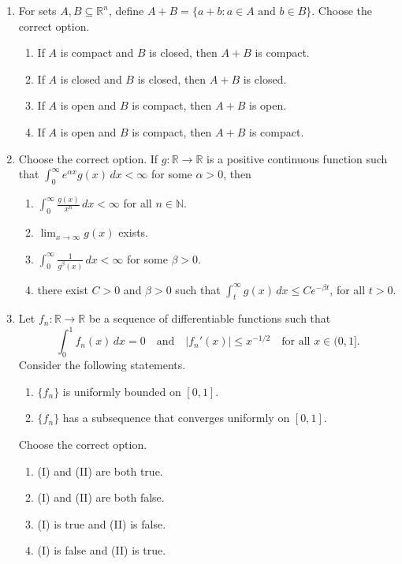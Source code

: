 \documentclass[11pt, a4paper]{article}
\begin{document}
\begin{enumerate}
  \item For sets $A, B \subseteq \mathbb{R}^n$, define $A + B = \{a + b : a \in A \text{ and } b \in B\}$. Choose the correct option.
  \begin{enumerate}[label=(\alph*)]
    \item If $A$ is compact and $B$ is closed, then $A + B$ is compact.
    \item If $A$ is closed and $B$ is closed, then $A + B$ is closed.
    \item If $A$ is open and $B$ is compact, then $A + B$ is open.
    \item If $A$ is open and $B$ is compact, then $A + B$ is compact.
  \end{enumerate}

  \item Choose the correct option. If $g: \mathbb{R} \to \mathbb{R}$ is a positive continuous function such that $\int_0^\infty e^{\alpha x} g(x)\,dx < \infty$ for some $\alpha > 0$, then
  \begin{enumerate}[label=(\alph*)]
    \item $\int_0^\infty \frac{g(x)}{x^n}\,dx < \infty$ for all $n \in \mathbb{N}$.
    \item $\lim_{x \to \infty} g(x)$ exists.
    \item $\int_0^\infty \frac{1}{g^\beta(x)}\,dx < \infty$ for some $\beta > 0$.
    \item there exist $C > 0$ and $\beta > 0$ such that $\int_t^\infty g(x)\,dx \le C e^{-\beta t}$, for all $t > 0$.
  \end{enumerate}

  \item Let $f_n: \mathbb{R} \to \mathbb{R}$ be a sequence of differentiable functions such that
  \[
    \int_0^1 f_n(x)\,dx = 0 \quad \text{and} \quad |f_n'(x)| \le x^{-1/2} \quad \text{for all } x \in (0,1].
  \]
  Consider the following statements.
  \begin{enumerate}[label=(\Roman*)]
    \item $\{f_n\}$ is uniformly bounded on $[0,1]$.
    \item $\{f_n\}$ has a subsequence that converges uniformly on $[0,1]$.
  \end{enumerate}
  Choose the correct option.
  \begin{enumerate}[label=(\alph*)]
    \item (I) and (II) are both true.
    \item (I) and (II) are both false.
    \item (I) is true and (II) is false.
    \item (I) is false and (II) is true.
  \end{enumerate}


\end{enumerate}
\end{document}
